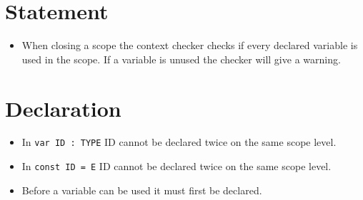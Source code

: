 \section{Statement}
\begin{itemize}
\item When closing a scope the context checker checks if every declared variable is used in the scope. If a variable is unused the checker will give a warning. 
\end{itemize}

\section{Declaration}
\begin{itemize}

\item In \texttt{var ID : TYPE} ID cannot be declared twice on the same scope level. 

\item In \texttt{const ID = E} ID cannot be declared twice on the same scope level. 

\item Before a variable can be used it must first be declared.


\end{itemize}

